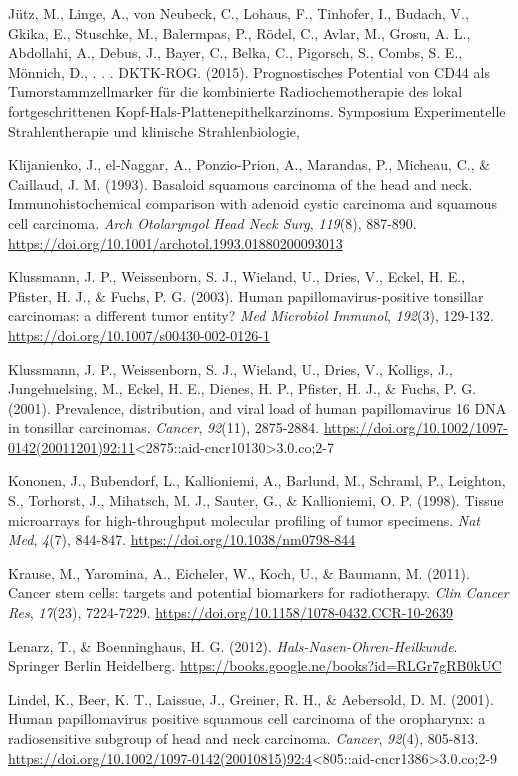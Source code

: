 Jütz, M., Linge, A., von Neubeck, C., Lohaus, F., Tinhofer, I., Budach, V., Gkika, E., Stuschke, M., Balermpas, P., Rödel, C., Avlar, M., Grosu, A. L., Abdollahi, A., Debus, J., Bayer, C., Belka, C., Pigorsch, S., Combs, S. E., Mönnich, D., . . . DKTK-ROG. (2015). Prognostisches Potential von CD44 als Tumorstammzellmarker für die kombinierte Radiochemotherapie des lokal fortgeschrittenen Kopf-Hals-Plattenepithelkarzinoms. Symposium Experimentelle Strahlentherapie und klinische Strahlenbiologie,

Klijanienko, J., el-Naggar, A., Ponzio-Prion, A., Marandas, P., Micheau, C., \& Caillaud, J. M. (1993). Basaloid squamous carcinoma of the head and neck. Immunohistochemical comparison with adenoid cystic carcinoma and squamous cell carcinoma. \emph{Arch Otolaryngol Head Neck Surg}, \emph{119}(8), 887-890. \url{https://doi.org/10.1001/archotol.1993.01880200093013}

Klussmann, J. P., Weissenborn, S. J., Wieland, U., Dries, V., Eckel, H. E., Pfister, H. J., \& Fuchs, P. G. (2003). Human papillomavirus-positive tonsillar carcinomas: a different tumor entity? \emph{Med Microbiol Immunol}, \emph{192}(3), 129-132. \url{https://doi.org/10.1007/s00430-002-0126-1}

Klussmann, J. P., Weissenborn, S. J., Wieland, U., Dries, V., Kolligs, J., Jungehuelsing, M., Eckel, H. E., Dienes, H. P., Pfister, H. J., \& Fuchs, P. G. (2001). Prevalence, distribution, and viral load of human papillomavirus 16 DNA in tonsillar carcinomas. \emph{Cancer}, \emph{92}(11), 2875-2884. \url{https://doi.org/10.1002/1097-0142(20011201)92:11}\textless2875::aid-cncr10130\textgreater3.0.co;2-7

Kononen, J., Bubendorf, L., Kallioniemi, A., Barlund, M., Schraml, P., Leighton, S., Torhorst, J., Mihatsch, M. J., Sauter, G., \& Kallioniemi, O. P. (1998). Tissue microarrays for high-throughput molecular profiling of tumor specimens. \emph{Nat Med}, \emph{4}(7), 844-847. \url{https://doi.org/10.1038/nm0798-844}

Krause, M., Yaromina, A., Eicheler, W., Koch, U., \& Baumann, M. (2011). Cancer stem cells: targets and potential biomarkers for radiotherapy. \emph{Clin Cancer Res}, \emph{17}(23), 7224-7229. \url{https://doi.org/10.1158/1078-0432.CCR-10-2639}

Lenarz, T., \& Boenninghaus, H. G. (2012). \emph{Hals-Nasen-Ohren-Heilkunde}. Springer Berlin Heidelberg. \url{https://books.google.ne/books?id=RLGr7gRB0kUC}

Lindel, K., Beer, K. T., Laissue, J., Greiner, R. H., \& Aebersold, D. M. (2001). Human papillomavirus positive squamous cell carcinoma of the oropharynx: a radiosensitive subgroup of head and neck carcinoma. \emph{Cancer}, \emph{92}(4), 805-813. \url{https://doi.org/10.1002/1097-0142(20010815)92:4}\textless805::aid-cncr1386\textgreater3.0.co;2-9

